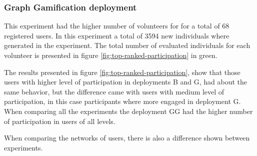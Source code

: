 \documentclass[conference]{IEEEtran}
\begin{document}
\subsubsection{ Graph Gamification deployment}
This experiment had the higher number of volunteers for for a total of 68 registered users. 
In this experiment a total of 3594 new individuals where generated in the experiment. 
The total number of evaluated individuals for each volunteer is presented in figure 
\ref{fig:top-ranked-participation} in green. 

The results presented in figure \ref{fig:top-ranked-participation}, show that those users with
higher level of participation in deployments B and G, had about the same behavior, but the difference
came with users with medium level of participation, in this case participants where more engaged in deployment
G. When comparing all the experiments the deployment GG had the higher number of participation in users
of all levels.    

When comparing the networks of users, there is also a difference shown between experiments. 
\end{document}
